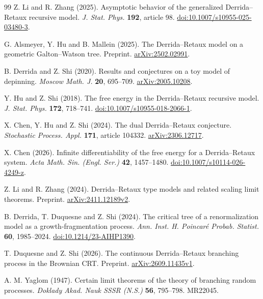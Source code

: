 \documentclass[11pt,letterpaper,reqno]{amsart}
\numberwithin{equation}{section}
\theoremstyle{plain}
\theoremstyle{remark}
\begin{document}
\begin{thebibliography}{99}
 Z. Li and R. Zhang (2025).
Asymptotic behavior of the generalized Derrida--Retaux recursive model.
\emph{J. Stat. Phys.} \textbf{192}, article 98.
\href{https://doi.org/10.1007/s10955-025-03480-3}{doi:10.1007/s10955-025-03480-3}.

 G. Alsmeyer, Y. Hu and B. Mallein (2025).
The Derrida--Retaux model on a geometric Galton--Watson tree.
Preprint.
\href{https://arxiv.org/abs/2502.02991}{arXiv:2502.02991}.

 B. Derrida and Z. Shi (2020).
Results and conjectures on a toy model of depinning.
\emph{Moscow Math. J.} \textbf{20}, 695--709.
\href{https://arxiv.org/abs/2005.10208}{arXiv:2005.10208}.

 Y. Hu and Z. Shi (2018).
The free energy in the Derrida--Retaux recursive model.
\emph{J. Stat. Phys.} \textbf{172}, 718--741.
\href{https://doi.org/10.1007/s10955-018-2066-1}{doi:10.1007/s10955-018-2066-1}.

 X. Chen, Y. Hu and Z. Shi (2024).
The dual Derrida--Retaux conjecture.
\emph{Stochastic Process. Appl.} \textbf{171}, article 104332.
\href{https://arxiv.org/abs/2306.12717}{arXiv:2306.12717}.

 X. Chen (2026).
Infinite differentiability of the free energy for a Derrida--Retaux system.
\emph{Acta Math. Sin. (Engl. Ser.)} \textbf{42}, 1457--1480.
\href{https://doi.org/10.1007/s10114-026-4249-z}{doi:10.1007/s10114-026-4249-z}.

 Z. Li and R. Zhang (2024).
Derrida--Retaux type models and related scaling limit theorems.
Preprint.
\href{https://arxiv.org/abs/2411.12189v2}{arXiv:2411.12189v2}.

 B. Derrida, T. Duquesne and Z. Shi (2024).
The critical tree of a renormalization model as a growth-fragmentation process.
\emph{Ann. Inst. H. Poincar\'e Probab. Statist.} \textbf{60}, 1985--2024.
\href{https://doi.org/10.1214/23-AIHP1390}{doi:10.1214/23-AIHP1390}.

 T. Duquesne and Z. Shi (2026).
The continuous Derrida--Retaux branching process in the Brownian CRT.
Preprint.
\href{https://arxiv.org/abs/2609.11435v1}{arXiv:2609.11435v1}.

 A. M. Yaglom (1947).
Certain limit theorems of the theory of branching random processes.
\emph{Doklady Akad. Nauk SSSR (N.S.)} \textbf{56}, 795--798.
MR22045.

\end{thebibliography}
\end{document}
